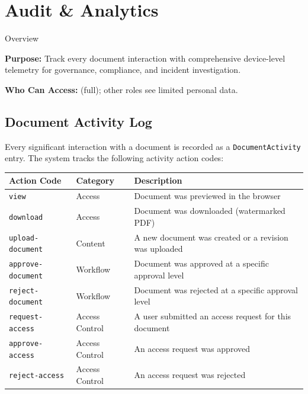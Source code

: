 \section{Audit \& Analytics}

\begin{ugModule}{Overview}

  \textbf{Purpose:}
  Track every document interaction with comprehensive
  device-level telemetry for governance, compliance, and
  incident investigation.

  \textbf{Who Can Access:}
    (full); other roles see
  limited personal data.
\end{ugModule}

\subsection{Document Activity Log}

Every significant interaction with a document is recorded as
a \texttt{DocumentActivity} entry. The system tracks the
following activity action codes:

\begin{tabularx}{\textwidth}{@{} l l X @{}}
  \toprule
  \textbf{Action Code} & \textbf{Category}
    & \textbf{Description} \\
  \midrule
  \texttt{view}
    & Access
    & Document was previewed in the browser \\
  \texttt{download}
    & Access
    & Document was downloaded (watermarked PDF) \\
  \texttt{upload-document}
    & Content
    & A new document was created or a revision
      was uploaded \\
  \texttt{approve-document}
    & Workflow
    & Document was approved at a specific
      approval level \\
  \texttt{reject-document}
    & Workflow
    & Document was rejected at a specific
      approval level \\
  \texttt{request-access}
    & Access Control
    & A user submitted an access request for
      this document \\
  \texttt{approve-access}
    & Access Control
    & An access request was approved \\
  \texttt{reject-access}
    & Access Control
    & An access request was rejected \\
  \bottomrule
\end{tabularx}

